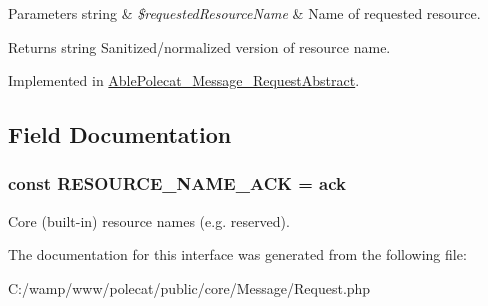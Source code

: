\begin{DoxyParams}[1]{Parameters}
string & {\em \$requested\+Resource\+Name} & Name of requested resource.\\
\hline
\end{DoxyParams}
\begin{DoxyReturn}{Returns}
string Sanitized/normalized version of resource name. 
\end{DoxyReturn}


Implemented in \hyperlink{class_able_polecat___message___request_abstract_a1e05d92c1527e5fbe83db15156e54457}{Able\+Polecat\+\_\+\+Message\+\_\+\+Request\+Abstract}.



\subsection{Field Documentation}
\hypertarget{interface_able_polecat___message___request_interface_aa207fcff72e63e4066e944379ff91baf}{}
\subsubsection[{R\+E\+S\+O\+U\+R\+C\+E\+\_\+\+N\+A\+M\+E\+\_\+\+A\+C\+K}]{\setlength{\rightskip}{0pt plus 5cm}const R\+E\+S\+O\+U\+R\+C\+E\+\_\+\+N\+A\+M\+E\+\_\+\+A\+C\+K = \textquotesingle{}ack\textquotesingle{}}\label{interface_able_polecat___message___request_interface_aa207fcff72e63e4066e944379ff91baf}
Core (built-\/in) resource names (e.\+g. \textquotesingle{}reserved\textquotesingle{}). 

The documentation for this interface was generated from the following file\+:\begin{DoxyCompactItemize}
\item 
C\+:/wamp/www/polecat/public/core/\+Message/Request.\+php\end{DoxyCompactItemize}

